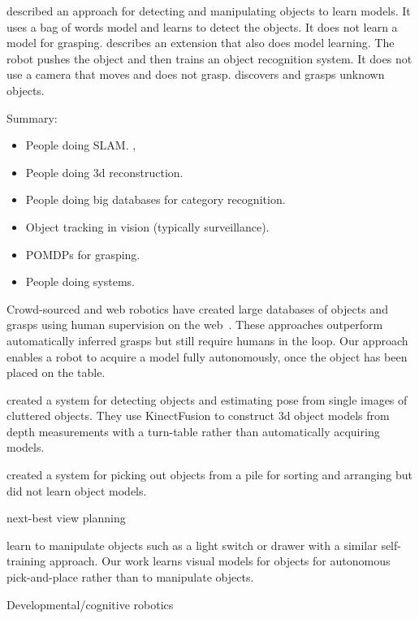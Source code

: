 \documentclass{article}
\begin{document}
\citet{ude12} described an approach for detecting and manipulating
objects to learn models.  It uses a bag of words model and learns to
detect the objects.  It does not learn a model for grasping.
\citet{schiebener13} describes an extension that also does model
learning.  The robot pushes the object and then trains an object
recognition system.  It does not use a camera that moves and does not
grasp.
\citet{schiebener12} discovers and grasps unknown objects.

Summary: 
\begin{itemize}
\item People doing SLAM.  \citet{wang07, gallagher09}, 
\item People doing 3d reconstruction.   \citet{krainin11, banta00}
\item People doing big databases for category recognition.  \citet{kent14a, kent14, lai11a, goldfeder09}
\item Object tracking in vision (typically surveillance).
\item POMDPs for grasping.  \citet{platt11, hsiao10}
\item People doing systems.  \citet{hudson12, ciocarlie14}
\end{itemize}




Crowd-sourced and web robotics have created large databases of objects
and grasps using human supervision on the web~\citep{kent14a, kent14}.
These approaches outperform automatically inferred grasps but still
require humans in the loop.  Our approach enables a robot to acquire a
model fully autonomously, once the object has been placed on the
table.

\citet{zhu14} created a system for detecting objects and estimating
pose from single images of cluttered objects.  They use KinectFusion
to construct 3d object models from depth measurements with a
turn-table rather than automatically acquiring models.

\citet{chang12} created a system for picking out objects from a pile
for sorting and arranging but did not learn object models.  

next-best view planning~\citep{kriegel11}

\citet{nguyen14} learn to manipulate objects such as a light switch or
drawer with a similar self-training approach.  Our work learns visual
models for objects for autonomous pick-and-place rather than to
manipulate objects.

Developmental/cognitive robotics~\citep{lyubova13, kraft10r}
\end{document}
